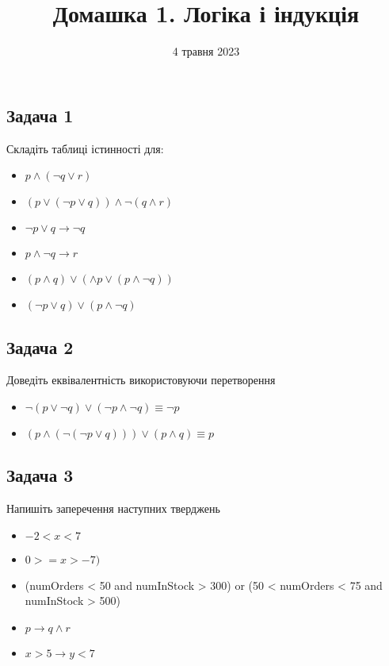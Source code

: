 \documentclass{article}
\begin{document}
\title{Домашка 1. Логіка і індукція}
\date{4 травня 2023}

\maketitle

\subsection*{Задача 1}
Складіть таблиці істинності для:
\begin{itemize}
    \item $p \land (\lnot q \lor r)$
    \item $(p \lor (\lnot p \lor q)) \land \lnot (q \land r)$
    \item $\lnot p \lor q \rightarrow \lnot q$
    \item $p \land \lnot q \rightarrow r $
    \item $(p \land q) \lor (\land p \lor (p \land \lnot q))$
    \item $(\lnot p \lor q) \lor (p \land \lnot q)$
\end{itemize}

\subsection*{Задача 2}
Доведіть еквівалентність використовуючи перетворення
\begin{itemize}
    \item $\lnot(p \lor \lnot q) \lor (\lnot p \land \lnot q) \equiv \lnot p$
    \item $(p \land (\lnot (\lnot p \lor q))) \lor (p \land q) \equiv p$
\end{itemize}

\subsection*{Задача 3}
Напишіть заперечення наступних тверджень
\begin{itemize}
    \item $-2 < x < 7$
    \item $0 >= x > -7)$
    \item (numOrders < 50 and numInStock > 300) or (50 < numOrders < 75 and numInStock > 500)
    \item $p \rightarrow q \land r$
    \item $x > 5 \rightarrow y < 7$
\end{itemize}
\end{document}
